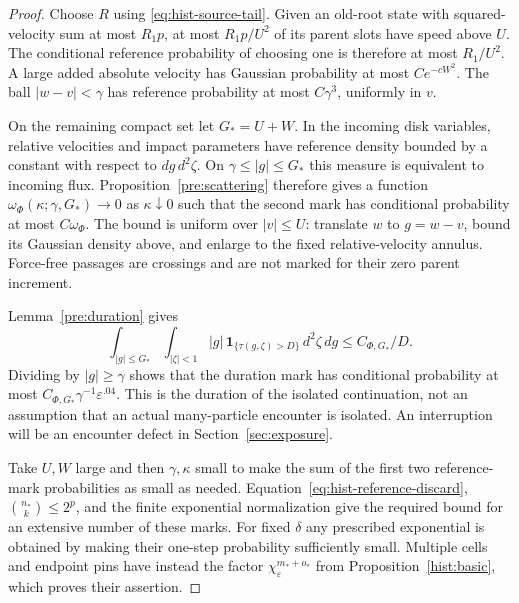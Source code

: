 \begin{proof}
Choose $R$ using \eqref{eq:hist-source-tail}.  Given an old-root state
with squared-velocity sum at most $R_1p$, at most $R_1p/U^2$ of its
parent slots have speed above $U$.  The conditional reference
probability of choosing one is therefore at most $R_1/U^2$.  A large
added absolute velocity has Gaussian probability at most
$Ce^{-cW^2}$.  The ball $|w-v|<\gamma$ has reference probability at
most $C\gamma^3$, uniformly in $v$.

On the remaining compact set let $G_*=U+W$.  In the incoming disk
variables, relative velocities and impact parameters have reference
density bounded by a constant with respect to $dg\,d^2\zeta$.
On $\gamma\leq|g|\leq G_*$ this measure is equivalent to incoming
flux.  Proposition~\ref{pre:scattering} therefore gives a function
$\omega_\Phi(\kappa;\gamma,G_*)\to0$ as $\kappa\downarrow0$ such
that the second mark has conditional probability at most
$C\omega_\Phi$.  The bound is uniform over $|v|\leq U$: translate
$w$ to $g=w-v$, bound its Gaussian density above, and enlarge to the
fixed relative-velocity annulus.  Force-free passages are crossings
and are not marked for their zero parent increment.

Lemma~\ref{pre:duration} gives
\[
 \int_{|g|\leq G_*}\int_{|\zeta|<1}
       |g|\,\mathbf1_{\{\tau(g,\zeta)>D\}}\,d^2\zeta\,dg
       \leq C_{\Phi,G_*}/D.
\]
Dividing by $|g|\geq\gamma$ shows that the duration mark has
conditional probability at most
$C_{\Phi,G_*}\gamma^{-1}\varepsilon^{.04}$.
This is the duration of the isolated continuation, not an assumption
that an actual many-particle encounter is isolated.  An interruption
will be an encounter defect in Section~\ref{sec:exposure}.

Take $U,W$ large and then $\gamma,\kappa$ small to make the sum of
the first two reference-mark probabilities as small as needed.
Equation~\eqref{eq:hist-reference-discard},
$\binom{n_*}{k}\leq2^p$, and the finite exponential normalization
give the required bound for an extensive number of these marks.
For fixed $\delta$ any prescribed exponential is obtained by making
their one-step probability sufficiently small.  Multiple cells and
endpoint pins have instead the factor
$\chi_\varepsilon^{m_*+o_*}$ from
Proposition~\ref{hist:basic}, which proves their assertion.


\end{proof}
